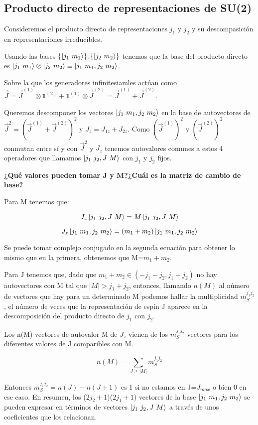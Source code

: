 \documentclass{article}
\begin{document}
\subsection{Producto directo de representaciones de SU(2)}

Consideremos el producto directo de representaciones $j_1$ y $ j_2$ y su descompasición en representaciones irreducibles.

Usando las bases $\{ \ket{j_1 \ m_1}\}, \{ \ket{j_2 \ m_2} \}$ tenemos que la base del producto directo es $ \ket{j_1 \ m_1} \otimes \ket{j_2 \ m_2} \equiv \ket{ j _1 \ m_1 , j_2 \ m_2}$.

Sobre la que los generadores infinitesiamles actúan como $\Vec{J}= \Vec{J}^{(1)}\otimes \mathds{1}^{(2)} + \mathds{1}^{(1)}\otimes \Vec{J}^{(2)} =\Vec{J}^{(1)} + \Vec{J}^{(2)}$.

\smallskip
Queremos descomponer los vectores $\ket{ j _1 \ m_1 , j_2 \ m_2}$ en la base de autovectores de $\Vec{J}^2=(\Vec{J}^{(1)} + \Vec{J}^{(2)})^2$ y $J_z=J_{1z}+J_{2z}$. Como $\left ( \Vec{J}^{(1)}\right)^2$ y $\left ( \Vec{J}^{(2)}\right)^2$ conmutan entre sí y con $\Vec{J}^2$ y $J_z$ tenemos autovalores comunes a estos 4 operadores que llamamos $\ket{j_1 \ j_2 , J \ M}$ con $j_1$ y $j_2$ fijos.

\bigskip
\textbf{¿Qué valores pueden tomar J y M?}\textbf{¿Cuál es la matriz de cambio de base?}

\smallskip
Para M tenemos que:

$$J_z\ket{j_1 \ j_2 , J \ M} = M \ket{j_1 \ j_2 , J \ M}$$

$$J_z\ket{j_1 \ m_1 , j_2 \ m_2}=(m_1+m_2)\ket{j_1 \ m_1 , j_2 \ m_2}$$

Se puede tomar complejo conjugado en la segunda ecuación para obtener lo mismo que en la primera, obtenemos que M=$m_1+m_2$.

\smallskip
Para J tenemos que, dado que $m_1+m_2 \in (-j_1-j_2,j_1+j_2)$ no hay autovectores con M tal que $|M|>j_1+j_2$, entonces, llamando $n(M)$ al número de vectores que hay para un determinado M podemos hallar la multiplicidad $m_S^{j_1j_2}$, el número de veces que la representación de espín J aparece en la descomposición del producto directo de $j_1$ con $j_2$.

\smallskip
Los n(M) vectores de autovalor M de $J_z$ vienen de los $m_S^{j_1j_2}$ vectores para los diferentes valores de J comparibles con M.

$$n(M)= \sum _{J\geq |M|}m_S^{j_1j_2}$$

Entonces $m_S^{j_1j_2} = n(J)-n(J+1)$ es 1 si no estamos en J=$J_{max}$ o bien 0 en ese caso. En resumen, los ($2j_2 + 1$)($2j_1+1$) vectores de la base $\ket{j_1 \ m_1,j_2 \ m_2}$ se pueden expresar en términos de vectores $\ket{j_1 \ j_2, J \ M}$ a través de unos coeficientes que los relacionan.
\end{document}
